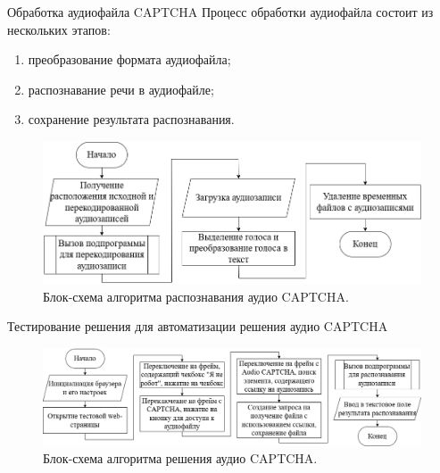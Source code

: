 \documentclass[12pt,a4paper,mathserif]{beamer}
\begin{document}
\begin{frame}{Обработка аудиофайла CAPTCHA}
    \setlength{\parindent}{0.5cm}
    Процесс обработки аудиофайла состоит из нескольких этапов:
    
    \begin{enumerate}
        \item преобразование формата аудиофайла;
        \item распознавание речи в аудиофайле;
        \item сохранение результата распознавания.
    \end{enumerate}

    \begin{figure}[H]
        \centering
        \includegraphics[width=1\linewidth]{imgs/flowchart-asr.png}
        \caption{Блок-схема алгоритма распознавания аудио CAPTCHA.}
    \end{figure}
\end{frame}

\begin{frame}{\small Тестирование решения для автоматизации решения аудио CAPTCHA}
    \begin{figure}
        \centering
        \includegraphics[width=1\linewidth]{imgs/flowchart-solve.png}
        \caption{Блок-схема алгоритма решения аудио CAPTCHA.}
    \end{figure}
\end{frame}
\end{document}
